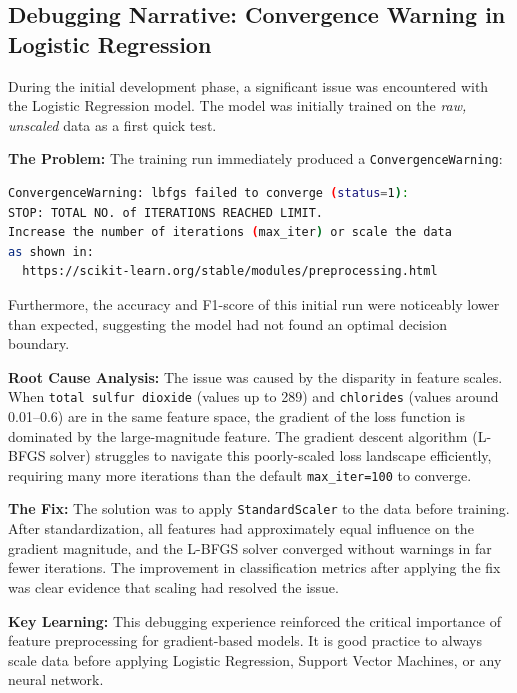 \documentclass[11pt,a4paper]{article}
\begin{document}
\subsection{Debugging Narrative: Convergence Warning in Logistic Regression}

During the initial development phase, a significant issue was encountered with the Logistic Regression model. The model was initially trained on the \textit{raw, unscaled} data as a first quick test.

\textbf{The Problem:} The training run immediately produced a \texttt{ConvergenceWarning}:

\begin{lstlisting}[language=bash, caption=ConvergenceWarning observed during initial training on unscaled data]
ConvergenceWarning: lbfgs failed to converge (status=1):
STOP: TOTAL NO. of ITERATIONS REACHED LIMIT.
Increase the number of iterations (max_iter) or scale the data
as shown in:
  https://scikit-learn.org/stable/modules/preprocessing.html
\end{lstlisting}

Furthermore, the accuracy and F1-score of this initial run were noticeably lower than expected, suggesting the model had not found an optimal decision boundary.

\textbf{Root Cause Analysis:} The issue was caused by the disparity in feature scales. When \texttt{total sulfur dioxide} (values up to 289) and \texttt{chlorides} (values around 0.01--0.6) are in the same feature space, the gradient of the loss function is dominated by the large-magnitude feature. The gradient descent algorithm (L-BFGS solver) struggles to navigate this poorly-scaled loss landscape efficiently, requiring many more iterations than the default \texttt{max\_iter=100} to converge.

\textbf{The Fix:} The solution was to apply \texttt{StandardScaler} to the data before training. After standardization, all features had approximately equal influence on the gradient magnitude, and the L-BFGS solver converged without warnings in far fewer iterations. The improvement in classification metrics after applying the fix was clear evidence that scaling had resolved the issue.

\textbf{Key Learning:} This debugging experience reinforced the critical importance of feature preprocessing for gradient-based models. It is good practice to always scale data before applying Logistic Regression, Support Vector Machines, or any neural network.
\end{document}
